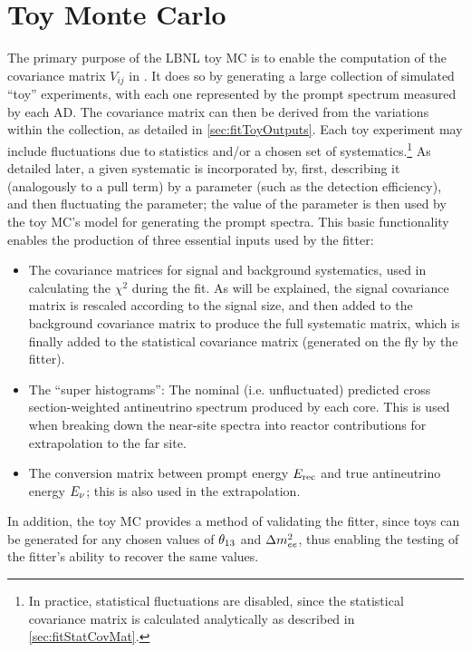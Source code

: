 \documentclass[../thesis.tex]{subfiles}
\begin{document}
\section{Toy Monte Carlo}
\label{sec:toymc}

The primary purpose of the LBNL toy MC \cite{berkeley_toymc} is to enable the computation of the covariance matrix $V_{ij}$ in \autocite{eq:fitCovChiSq}. It does so by generating a large collection of simulated ``toy'' experiments, with each one represented by the prompt spectrum measured by each AD. The covariance matrix can then be derived from the variations within the collection, as detailed in \autoref{sec:fitToyOutputs}. Each toy experiment may include fluctuations due to statistics and/or a chosen set of systematics.\footnote{In practice, statistical fluctuations are disabled, since the statistical covariance matrix is calculated analytically as described in \autoref{sec:fitStatCovMat}.} As detailed later, a given systematic is incorporated by, first, describing it (analogously to a pull term) by a parameter (such as the detection efficiency), and then fluctuating the parameter; the value of the parameter is then used by the toy MC's model for generating the prompt spectra. This basic functionality enables the production of three essential inputs used by the fitter:

\begin{itemize}
\item The covariance matrices for signal and background systematics, used in calculating the $\chi^2$ during the fit. As will be explained, the signal covariance matrix is rescaled according to the signal size, and then added to the background covariance matrix to produce the full systematic matrix, which is finally added to the statistical covariance matrix (generated on the fly by the fitter).
\item The ``super histograms'': The nominal (i.e. unfluctuated) predicted cross section-weighted antineutrino spectrum produced by each core. This is used when breaking down the near-site spectra into reactor contributions for extrapolation to the far site.
\item The conversion matrix between prompt energy $E_\mathrm{rec}$ and true antineutrino energy $E_\mathrm{\nu}$; this is also used in the extrapolation.
\end{itemize}

In addition, the toy MC provides a method of validating the fitter, since toys can be generated for any chosen values of $\theta_{13}$ and $\Delta m^2_{ee}$, thus enabling the testing of the fitter's ability to recover the same values.
\end{document}
